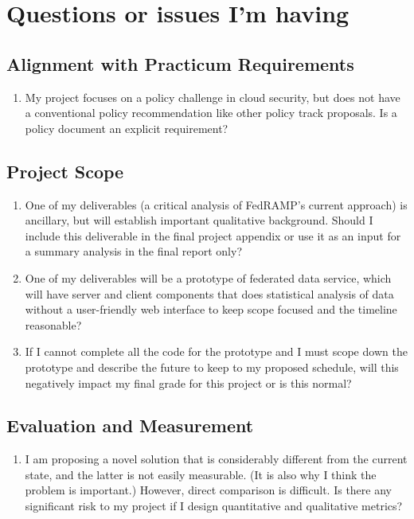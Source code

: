 \documentclass{jdf}
\begin{document}
\section*{Questions or issues I'm having}

\subsection*{Alignment with Practicum Requirements}

\begin{enumerate}
    \item My project focuses on a policy challenge in cloud security, but does not have a conventional policy recommendation like other policy track proposals. Is a policy document an explicit requirement?
\end{enumerate}

\subsection*{Project Scope}

\begin{enumerate}
    \item One of my deliverables (a critical analysis of FedRAMP's current approach) is ancillary, but will establish important qualitative background. Should I include this deliverable in the final project appendix or use it as an input for a summary analysis in the final report only?
    \item One of my deliverables will be a prototype of federated data service, which will have server and client components that does statistical analysis of data without a user-friendly web interface to keep scope focused and the timeline reasonable?
    \item If I cannot complete all the code for the prototype and I must scope down the prototype and describe the future to keep to my proposed schedule, will this negatively impact my final grade for this project or is this normal?
\end{enumerate}

\subsection*{Evaluation and Measurement}

\begin{enumerate}
    \item I am proposing a novel solution that is considerably different from the current state, and the latter is not easily measurable. (It is also why I think the problem is important.) However, direct comparison is difficult. Is there any significant risk to my project if I design quantitative and qualitative metrics?    
\end{enumerate}
\end{document}

